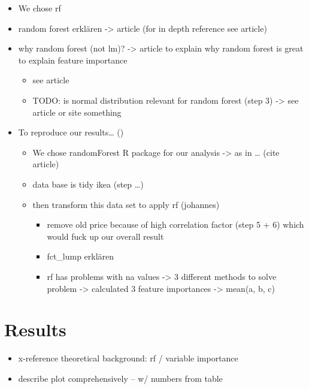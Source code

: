 \documentclass[a4paper, nobind]{templates/ociamthesis}
\providecommand{\tightlist}{%
  \setlength{\itemsep}{0pt}\setlength{\parskip}{0pt}}
\begin{document}
\begin{itemize}
\tightlist
\item
  We chose rf
\item
  random forest erklären -\textgreater{} article (for in depth reference see article)
\item
  why random forest (not lm)? -\textgreater{} article to explain why random forest is great to explain feature importance

  \begin{itemize}
  \tightlist
  \item
    see article
  \item
    TODO: is normal distribution relevant for random forest (step 3) -\textgreater{} see article or site something
  \end{itemize}
\item
  To reproduce our results\ldots{} (\textcite{Johannes})

  \begin{itemize}
  \tightlist
  \item
    We chose randomForest R package for our analysis -\textgreater{} as in \ldots{} (cite article)
  \item
    data base is tidy ikea (step \ldots{})
  \item
    then transform this data set to apply rf (johannes)

    \begin{itemize}
    \tightlist
    \item
      remove old price because of high correlation factor (step 5 + 6) which would fuck up our overall result
    \item
      fct\_lump erklären
    \item
      rf has problems with na values -\textgreater{} 3 different methods to solve problem -\textgreater{} calculated 3 feature importances -\textgreater{} mean(a, b, c)
    \end{itemize}
  \end{itemize}
\end{itemize}

\hypertarget{results}{%
\chapter{Results}\label{results}}

\begin{itemize}
\tightlist
\item
  x-reference theoretical background: rf / variable importance
\item
  describe plot comprehensively -- w/ numbers from table
\end{itemize}
\end{document}
